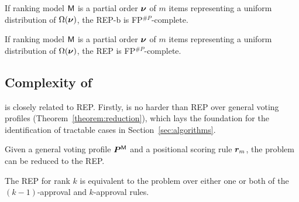 \begin{lemma} \label{lemma:REPt_shaPcomplete_over_partialOrders}
    \lemmaREPtHardnessOverPartialOrders
\end{lemma}

\def\lemmaREPbHardnessOverPartialOrders{
    If ranking model $\model$ is a partial order $\partialOrder$ of $m$ items representing a uniform distribution of $\Omega(\partialOrder)$, the REP-b is FP$^{\#P}$-complete.
}

\begin{lemma} \label{lemma:REPb_shaPcomplete_over_partialOrders}
	\lemmaREPbHardnessOverPartialOrders
\end{lemma}

\def\theoremRepHardnessOverPartialOrders{
    If ranking model $\model$ is a partial order $\partialOrder$ of $m$ items representing a uniform distribution of $\Omega(\partialOrder)$, the REP is FP$^{\#P}$-complete.
}

\begin{theorem}
    \label{theorem:REP_shaPcomplete_over_partialOrders}
    \theoremRepHardnessOverPartialOrders
\end{theorem}

\subsection{Complexity of \esc}

\esc is closely related to REP.  Firstly,  \esc  is no harder than REP over general voting profiles (Theorem~\ref{theorem:reduction}), which lays the foundation for the identification of tractable cases in Section~\ref{sec:algorithms}.

\def\theoremReductionEscToRep{
    Given a general voting profile $\probaVP$ and a positional scoring rule $\vr_m$, the \esc problem can be reduced to the REP.
}

\begin{theorem} \label{theorem:reduction}
    \theoremReductionEscToRep
\end{theorem}

\def\theoremRepMewEquivalentUnderKapproval{
    The REP for rank $k$ is equivalent to the \esc problem over either one or both of the $(k-1)$-approval and $k$-approval rules.
}

\begin{theorem} \label{theorem:REP_MEW_equivalent_under_k_approval}
    \theoremRepMewEquivalentUnderKapproval
\end{theorem}

